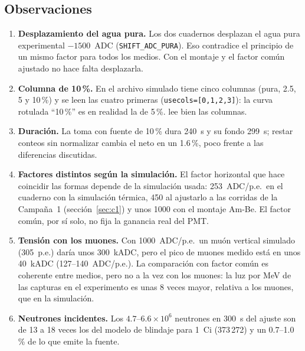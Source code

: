 \documentclass[11pt,a4paper]{article}
\begin{document}
\subsection{Observaciones}
\begin{enumerate}
\item \textbf{Desplazamiento del agua pura.} Los dos cuadernos desplazan el agua pura experimental $-1500$~ADC
(\texttt{SHIFT\_ADC\_PURA}). Eso contradice el principio de un mismo factor para todos los medios. Con el montaje y el
factor común ajustado no hace falta desplazarla.
\item \textbf{Columna de 10\,\%.} En  el archivo simulado tiene cinco
columnas (pura, 2.5, 5 y 10\,\%) y se leen las cuatro primeras (\texttt{usecols=[0,1,2,3]}): la curva rotulada
``10\,\%'' es en realidad la de 5\,\%.  lee bien las columnas.
\item \textbf{Duración.} La toma con fuente de 10\,\% dura 240~s y su fondo 299~s; restar conteos sin normalizar
cambia el neto en un 1.6\,\%, poco frente a las diferencias discutidas.
\item \textbf{Factores distintos según la simulación.} El factor horizontal que hace coincidir las formas depende de la
simulación usada: 253~ADC/p.e.\ en el cuaderno con la simulación térmica, 450 al ajustarlo a las corridas de la
Campaña~1 (sección~\ref{sec:c1}) y unos 1000 con el montaje Am-Be. El factor común, por sí solo,
no fija la ganancia real del PMT.
\item \textbf{Tensión con los muones.} Con 1000~ADC/p.e.\ un muón vertical simulado (305~p.e.) daría unos 300~kADC,
pero el pico de muones medido está en unos 40~kADC (127--140~ADC/p.e.). La comparación con factor común es coherente
entre medios, pero no a la vez con los muones: la luz por MeV de las capturas en el experimento es unas 8 veces mayor,
relativa a los muones, que en la simulación.
\item \textbf{Neutrones incidentes.} Los $4.7$--$6.6\times10^6$ neutrones en 300~s del ajuste son de 13 a 18 veces los
del modelo de blindaje para 1~Ci (373\,272) y un 0.7--1.0\,\% de lo que emite la fuente.
\end{enumerate}
\end{document}
